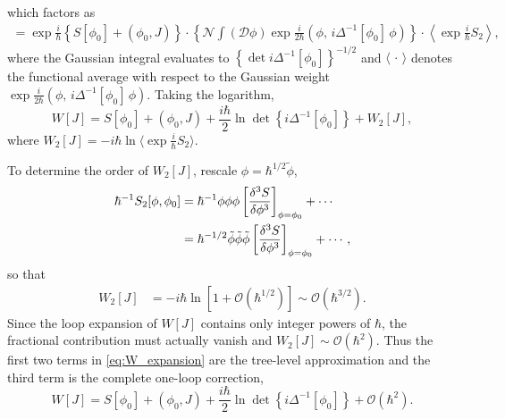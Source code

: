 which factors as
\begin{multline}
	= \exp\frac{i}{\hbar}\left\{S[\phi_0]+(\phi_0,J)\right\}
	\cdot\left\{\mathcal{N}\int(\mathcal{D}\phi)
	\exp\frac{i}{2\hbar}(\phi,\,i\Delta^{-1}[\phi_0]\,\phi)\right\}
	\cdot\left\langle\exp\frac{i}{\hbar}S_2\right\rangle,
\end{multline}
where the Gaussian integral evaluates to
$\left\{\det i\Delta^{-1}[\phi_0]\right\}^{-1/2}$ and $\langle\,\cdot\,\rangle$
denotes the functional average with respect to the Gaussian weight
$\exp\frac{i}{2\hbar}(\phi,\,i\Delta^{-1}[\phi_0]\,\phi)$. Taking the
logarithm,
\begin{equation}
	W[J] = S[\phi_0] + (\phi_0,J)
	+ \frac{i\hbar}{2}\ln\det\left\{i\Delta^{-1}[\phi_0]\right\}
	+ W_2[J],
	\label{eq:W_expansion}
\end{equation}
where $W_2[J] = -i\hbar\ln\langle\exp\frac{i}{\hbar}S_2\rangle$.

To determine the order of $W_2[J]$, rescale $\phi = \hbar^{1/2}\tilde\phi$,
\begin{align}
	\hbar^{-1}S_2[\phi,\phi_0]
	 & = \hbar^{-1}\phi\phi\phi
	\left[\frac{\delta^3 S}{\delta\phi^3}\right]_{\phi=\phi_0}
	+ \cdots \notag                                 \\
	 & = \hbar^{-1/2}\tilde\phi\tilde\phi\tilde\phi
	\left[\frac{\delta^3 S}{\delta\phi^3}\right]_{\phi=\phi_0}
	+ \cdots,
\end{align}
so that
\begin{align}
	W_2[J] & = -i\hbar\ln\left[1+\mathcal{O}(\hbar^{1/2})\right]
	\sim \mathcal{O}(\hbar^{3/2}).
\end{align}
Since the loop expansion of $W[J]$ contains only integer powers of $\hbar$,
the fractional contribution must actually vanish and $W_2[J]\sim\mathcal{O}(\hbar^2)$.
Thus the first two terms in \eqref{eq:W_expansion} are the tree-level
approximation and the third term is the complete one-loop correction,
\begin{equation}
	W[J] = S[\phi_0] + (\phi_0,J)
	+ \frac{i\hbar}{2}\ln\det\left\{i\Delta^{-1}[\phi_0]\right\}
	+ \mathcal{O}(\hbar^2).
\end{equation}

